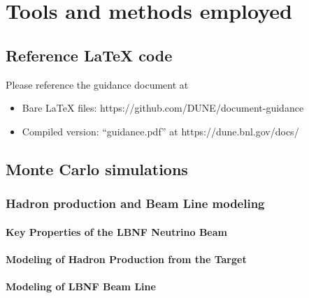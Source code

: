 \chapter{Tools and methods employed}
\label{ch:tools}


\section{Reference LaTeX code}

Please reference the guidance document at 

\begin{itemize}
\item Bare LaTeX files: https://github.com/DUNE/document-guidance
\item Compiled version: ``guidance.pdf'' at https://dune.bnl.gov/docs/
\end{itemize}


\section{Monte Carlo simulations}
\label{sec:tools-mc}

\subsection{Hadron production and Beam Line modeling}
\label{sec:tools-mc-had-beam}

\subsubsection{Key Properties of the LBNF Neutrino Beam}
\label{ss:tools-beam-properties}

\subsubsection{Modeling of Hadron Production from the Target}
\label{ss:tools-hadron-production-modeling}

\subsubsection{Modeling of LBNF Beam Line}
\label{ss:tools-beam-line-modeling}

